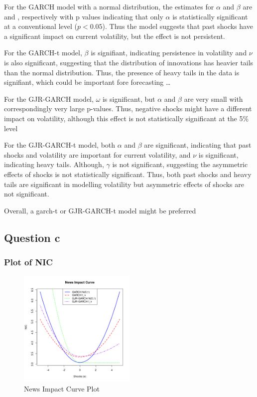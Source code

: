 \documentclass{article}
\begin{document}
For the GARCH model with a normal distribution, the estimates for $\alpha$ and $\beta$ are \bw and \bb, respectively with p values indicating that only $\alpha$ is statistically significant at a conventional level ($p < 0.05$). Thus the model suggests that past shocks have a significant impact on current volatility, but the effect is not persistent. 

For the GARCH-t model, $\beta$ is signifiant, indicating persistence in volatility and $\nu$ is also significant, suggesting that the distribution of innovations has heavier tails than the normal distribution. 
Thus, the presence of heavy tails in the data is signifiant, which could be important fore forecasting \ldots

For the GJR-GARCH model, $\omega$ is significant, but $\alpha$ and $\beta$ are very small with correspondingly very large p-values. 
Thus, negative shocks might have a different impact on volatility, although this effect is not statistically significant at the 5\% level

For the GJR-GARCH-t model, both $\alpha$ and $\beta$ are significant, indicating that past shocks and volatility are important for current volatility, and $\nu$ is significant, indicating heavy tails. 
Although, $\gamma$ is not significant, suggesting the asymmetric effects of shocks is not statistically significant. 
Thus, both past shocks and heavy tails are significant in modelling volatility but asymmetric effects of shocks are not significant. 

Overall, a garch-t or GJR-GARCH-t model might be preferred


\subsection*{Question c}
\subsubsection*{Plot of NIC}
 
\begin{figure}[H]
    \centering
    \includegraphics[width=0.5\textwidth]{../../docs/figures/NIC.png}
    \caption{News Impact Curve Plot}
    \label{fig:logreturn}
\end{figure}
\end{document}

